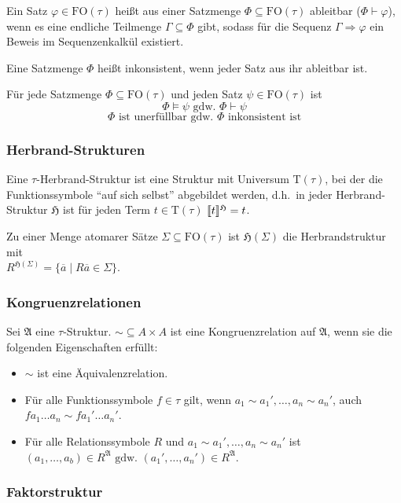 \documentclass[a4paper,parskip=half*,DIV=15,fontsize=11pt]{scrartcl}
\DeclarePairedDelimiter\interpret{\llbracket}{\rrbracket}
\newcommand{\A}{\mathfrak{A}}
\newcommand{\FO}{\mathrm{FO}}
\newcommand{\T}{\mathrm{T}}
\newcommand{\proves}{\vdash}
\newcommand{\He}{\mathfrak{H}}
\begin{document}
Ein Satz $\varphi \in \FO(\tau)$ heißt aus einer Satzmenge $\Phi \subseteq \FO(\tau)$ ableitbar ($\Phi \proves \varphi$), wenn es eine endliche Teilmenge $\Gamma \subseteq \Phi$ gibt, sodass für die Sequenz $\Gamma \Rightarrow \varphi$ ein Beweis im Sequenzenkalkül existiert.

Eine Satzmenge $\Phi$ heißt inkonsistent, wenn jeder Satz aus ihr ableitbar ist.

Für jede Satzmenge $\Phi \subseteq \FO(\tau)$ und jeden Satz $\psi \in \FO(\tau)$ ist
\[
\Phi \models \psi \text{ gdw.\ } \Phi \proves \psi
\]
\[
\Phi \text{ ist unerfüllbar gdw.\ } \Phi \text{ inkonsistent ist}
\]

\subsubsection{Herbrand-Strukturen}

Eine $\tau$-Herbrand-Struktur ist eine Struktur mit Universum $\T(\tau)$, bei der die Funktionssymbole ``auf sich selbst'' abgebildet werden, d.h.\ in jeder Herbrand-Struktur $\He$ ist für jeden Term $t \in \T(\tau)$ $\interpret{t}^\He = t$.

Zu einer Menge atomarer Sätze $\Sigma \subseteq \FO(\tau)$ ist $\He(\Sigma)$ die Herbrandstruktur mit   \\
$R^{\He(\Sigma)} = \{\overline{a} \;|\; R\overline{a} \in \Sigma\}$.

\subsubsection{Kongruenzrelationen}

Sei $\A$ eine $\tau$-Struktur. ${\sim} \subseteq A \times A$ ist eine Kongruenzrelation auf $\A$, wenn sie die folgenden Eigenschaften erfüllt:
\begin{itemize}
\item $\sim$ ist eine Äquivalenzrelation.
\item Für alle Funktionssymbole $f \in \tau$ gilt, wenn $a_1 \sim a_1', \ldots, a_n \sim a_n'$, auch $f a_1 \ldots a_n \sim f a_1' \ldots a_n'$.
\item Für alle Relationssymbole $R$ und $a_1 \sim a_1', \ldots, a_n \sim a_n'$ ist \\$(a_1, \ldots, a_b) \in R^\A \text{ gdw.\ }(a_1', \ldots, a_n') \in R^\A$.
\end{itemize}

\subsubsection{Faktorstruktur}
\end{document}
